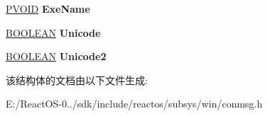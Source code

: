 \begin{DoxyCompactItemize}
\hyperlink{interfacevoid}{P\+V\+O\+ID} {\bfseries Exe\+Name}
\item 
\mbox{\label{struct___c_o_n_s_o_l_e___a_d_d_g_e_t_a_l_i_a_s_a39e0a1e03ce9122934982efb98d4c418}} 
\hyperlink{_processor_bind_8h_a112e3146cb38b6ee95e64d85842e380a}{B\+O\+O\+L\+E\+AN} {\bfseries Unicode}
\item 
\mbox{\label{struct___c_o_n_s_o_l_e___a_d_d_g_e_t_a_l_i_a_s_aed2b7336da77ed48d58a6c21c93dba22}} 
\hyperlink{_processor_bind_8h_a112e3146cb38b6ee95e64d85842e380a}{B\+O\+O\+L\+E\+AN} {\bfseries Unicode2}
\end{DoxyCompactItemize}


该结构体的文档由以下文件生成\+:\begin{DoxyCompactItemize}
\item 
E\+:/\+React\+O\+S-\/0../sdk/include/reactos/subsys/win/conmsg.\+h\end{DoxyCompactItemize}
